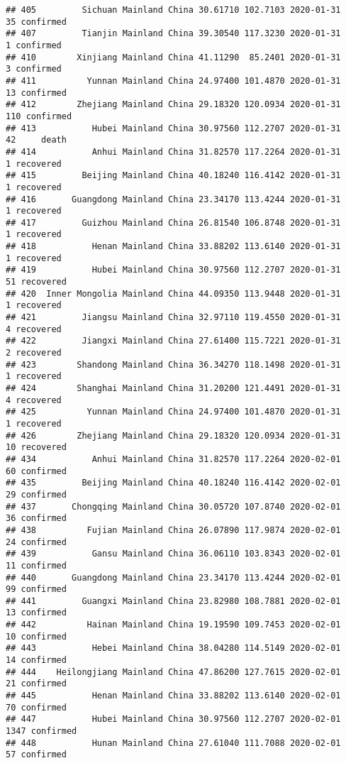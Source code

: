 \documentclass[
]{article}
\begin{document}
\begin{verbatim}
## 405         Sichuan Mainland China 30.61710 102.7103 2020-01-31    35 confirmed
## 407         Tianjin Mainland China 39.30540 117.3230 2020-01-31     1 confirmed
## 410        Xinjiang Mainland China 41.11290  85.2401 2020-01-31     3 confirmed
## 411          Yunnan Mainland China 24.97400 101.4870 2020-01-31    13 confirmed
## 412        Zhejiang Mainland China 29.18320 120.0934 2020-01-31   110 confirmed
## 413           Hubei Mainland China 30.97560 112.2707 2020-01-31    42     death
## 414           Anhui Mainland China 31.82570 117.2264 2020-01-31     1 recovered
## 415         Beijing Mainland China 40.18240 116.4142 2020-01-31     1 recovered
## 416       Guangdong Mainland China 23.34170 113.4244 2020-01-31     1 recovered
## 417         Guizhou Mainland China 26.81540 106.8748 2020-01-31     1 recovered
## 418           Henan Mainland China 33.88202 113.6140 2020-01-31     1 recovered
## 419           Hubei Mainland China 30.97560 112.2707 2020-01-31    51 recovered
## 420  Inner Mongolia Mainland China 44.09350 113.9448 2020-01-31     1 recovered
## 421         Jiangsu Mainland China 32.97110 119.4550 2020-01-31     4 recovered
## 422         Jiangxi Mainland China 27.61400 115.7221 2020-01-31     2 recovered
## 423        Shandong Mainland China 36.34270 118.1498 2020-01-31     1 recovered
## 424        Shanghai Mainland China 31.20200 121.4491 2020-01-31     4 recovered
## 425          Yunnan Mainland China 24.97400 101.4870 2020-01-31     1 recovered
## 426        Zhejiang Mainland China 29.18320 120.0934 2020-01-31    10 recovered
## 434           Anhui Mainland China 31.82570 117.2264 2020-02-01    60 confirmed
## 435         Beijing Mainland China 40.18240 116.4142 2020-02-01    29 confirmed
## 437       Chongqing Mainland China 30.05720 107.8740 2020-02-01    36 confirmed
## 438          Fujian Mainland China 26.07890 117.9874 2020-02-01    24 confirmed
## 439           Gansu Mainland China 36.06110 103.8343 2020-02-01    11 confirmed
## 440       Guangdong Mainland China 23.34170 113.4244 2020-02-01    99 confirmed
## 441         Guangxi Mainland China 23.82980 108.7881 2020-02-01    13 confirmed
## 442          Hainan Mainland China 19.19590 109.7453 2020-02-01    10 confirmed
## 443           Hebei Mainland China 38.04280 114.5149 2020-02-01    14 confirmed
## 444    Heilongjiang Mainland China 47.86200 127.7615 2020-02-01    21 confirmed
## 445           Henan Mainland China 33.88202 113.6140 2020-02-01    70 confirmed
## 447           Hubei Mainland China 30.97560 112.2707 2020-02-01  1347 confirmed
## 448           Hunan Mainland China 27.61040 111.7088 2020-02-01    57 confirmed

\end{verbatim}
\end{document}
